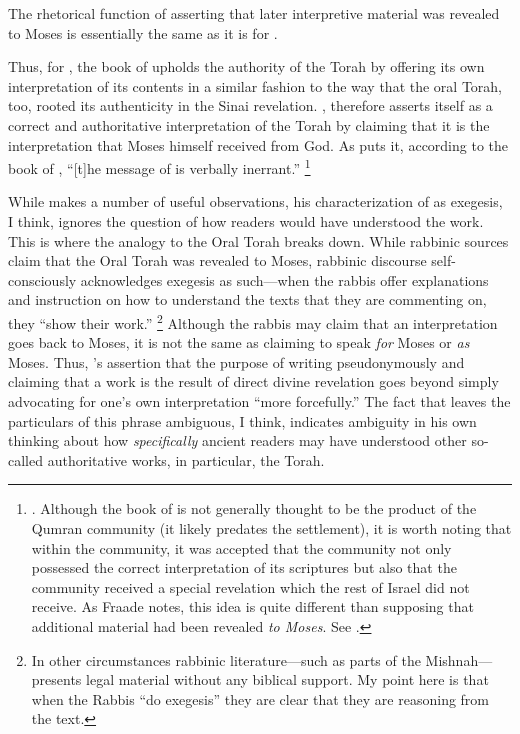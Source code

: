 \noindent
The rhetorical function of asserting that later interpretive material was revealed to Moses is essentially the same as it is for \jub.

Thus, for \vanderkam, the book of \jub upholds the authority of the Torah by offering its own interpretation of its contents in a similar fashion to the way that the oral Torah, too, rooted its authenticity in the Sinai revelation. \jub, therefore asserts itself as a correct and authoritative interpretation of the Torah by claiming that it is the interpretation that Moses himself received from God. As \vanderkam puts it, according to the book of \jub, ``[t]he message of \jub is verbally inerrant.''%
    \footnote{%
        \cite[33]{vanderkam_metso-etal2010}.
        Although the book of \jub is not generally thought to be the product of the Qumran community (it likely predates the settlement), it is worth noting that within the community, it was accepted that the community not only possessed the correct interpretation of its scriptures but also that the community received a special revelation which the rest of Israel did not receive. As Fraade notes, this idea is quite different than supposing that additional material had been revealed \emph{to Moses}. See 
        \cite[67]{fraade_jjs1993}.}

While \vanderkam makes a number of useful observations, his characterization of \jub as exegesis, I think, ignores the question of how readers would have understood the work. This is where the analogy to the Oral Torah breaks down. While rabbinic sources claim that the Oral Torah was revealed to Moses, rabbinic discourse self-consciously acknowledges exegesis as such---when the rabbis offer explanations and instruction on how to understand the texts that they are commenting on, they ``show their work.''%
    \footnote{%
        In other circumstances rabbinic literature---such as parts of the Mishnah---presents legal material without any biblical support. My point here is that when the Rabbis ``do exegesis'' they are clear that they are reasoning from the text.}
Although the rabbis may claim that an interpretation goes back to Moses, it is not the same as claiming to speak \emph{for} Moses or \emph{as} Moses. Thus, \vanderkam's assertion that the purpose of writing pseudonymously and claiming that a work is the result of direct divine revelation goes beyond simply advocating for one's own interpretation ``more forcefully.'' The fact that \vanderkam leaves the particulars of this phrase ambiguous, I think, indicates ambiguity in his own thinking about how \emph{specifically} ancient readers may have understood \jub \visavis other so-called authoritative works, in particular, the Torah.


